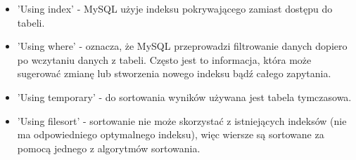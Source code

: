 \begin{itemize}
	\item 'Using index' - MySQL użyje indeksu pokrywającego zamiast dostępu do tabeli.
	\item 'Using where' - oznacza, że MySQL przeprowadzi filtrowanie danych dopiero po wczytaniu danych z tabeli. Często jest to informacja, która może sugerować zmianę lub stworzenia nowego indeksu bądź całego zapytania.
	\item 'Using temporary' - do sortowania wyników używana jest tabela tymczasowa.
	\item 'Using filesort' - sortowanie nie może skorzystać z istniejących indeksów (nie ma odpowiedniego optymalnego indeksu), więc wiersze są sortowane za pomocą jednego z algorytmów sortowania.
	
\end{itemize}